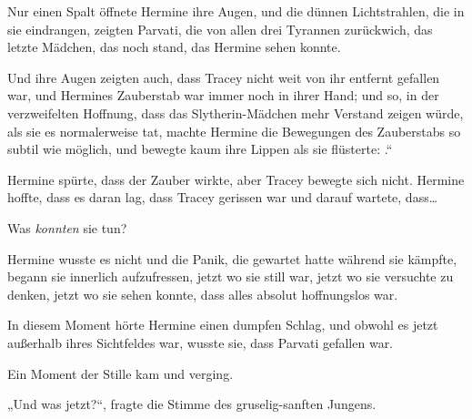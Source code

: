 Nur einen Spalt öffnete Hermine ihre Augen, und die dünnen Lichtstrahlen, die in sie eindrangen, zeigten Parvati, die von allen drei Tyrannen zurückwich, das letzte Mädchen, das noch stand, das Hermine sehen konnte.

Und ihre Augen zeigten auch, dass Tracey nicht weit von ihr entfernt gefallen war, und Hermines Zauberstab war immer noch in ihrer Hand; und so, in der verzweifelten Hoffnung, dass das Slytherin-Mädchen mehr Verstand zeigen würde, als sie es normalerweise tat, machte Hermine die Bewegungen des Zauberstabs so subtil wie möglich, und bewegte kaum ihre Lippen als sie flüsterte: .“

Hermine spürte, dass der Zauber wirkte, aber Tracey bewegte sich nicht. Hermine hoffte, dass es daran lag, dass Tracey gerissen war und darauf wartete, dass…

Was \emph{konnten} sie tun?

Hermine wusste es nicht und die Panik, die gewartet hatte während sie kämpfte, begann sie innerlich aufzufressen, jetzt wo sie still war, jetzt wo sie versuchte zu denken, jetzt wo sie sehen konnte, dass alles absolut hoffnungslos war.

In diesem Moment hörte Hermine einen dumpfen Schlag, und obwohl es jetzt außerhalb ihres Sichtfeldes war, wusste sie, dass Parvati gefallen war.

Ein Moment der Stille kam und verging.

„Und was jetzt?“, fragte die Stimme des gruselig-sanften Jungens.

